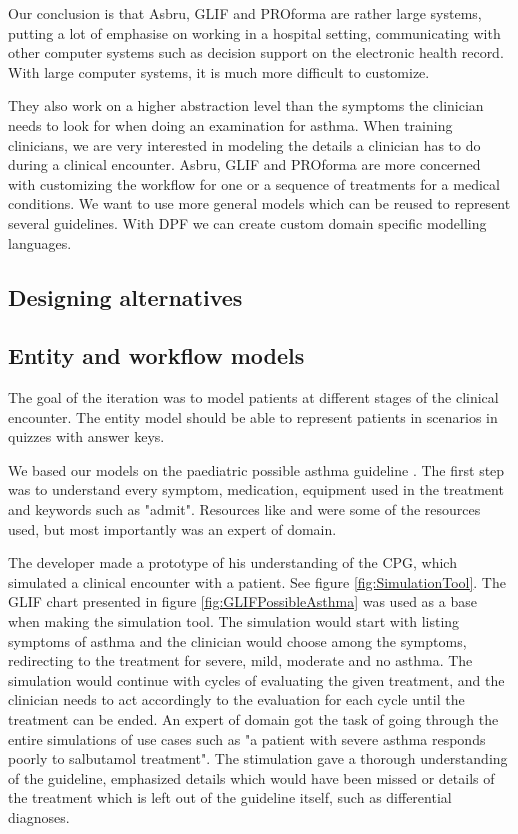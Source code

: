 Our conclusion is that Asbru, GLIF and PROforma are rather large systems, putting a lot of emphasise on working in a hospital setting, communicating with other computer systems such as decision support on the electronic health record. With large computer systems, it is much more difficult to customize.

They also work on a higher abstraction level than the symptoms the clinician needs to look for when doing an examination for asthma. When training clinicians, we are very interested in modeling the details a clinician has to do during a clinical encounter. Asbru, GLIF and PROforma are more concerned with customizing the workflow for one or a sequence of treatments for a medical conditions. We want to use more general models which can be reused to represent several guidelines. With DPF we can create custom domain specific modelling languages.


\subsection{Designing alternatives}

\subsection {Entity and workflow models}
The goal of the iteration was to model patients at different stages of the clinical encounter. The entity model should be able to represent patients in scenarios in quizzes with answer keys.

We based our models on the paediatric possible asthma guideline \cite{RepublicofKeny2016}. The first step was to understand every symptom, medication, equipment used in the treatment and keywords such as "admit". Resources like \textcite{Disease2011} and \textcite{Johansen2018} were some of the resources used, but most importantly was an expert of domain. 

The developer made a prototype of his understanding of the CPG, which simulated a clinical encounter with a patient. See figure \ref{fig:SimulationTool}. The GLIF chart presented in figure \ref{fig:GLIFPossibleAsthma} was used as a base when making the simulation tool. The simulation would start with listing symptoms of asthma and the clinician would choose among the symptoms, redirecting to the treatment for severe, mild, moderate and no asthma. The simulation would continue with cycles of evaluating the given treatment, and the clinician needs to act accordingly to the evaluation for each cycle until the treatment can be ended. An expert of domain got the task of going through the entire simulations of use cases such as "a patient with severe asthma responds poorly to salbutamol treatment". The stimulation gave a thorough understanding of the guideline, emphasized details which would have been missed or details of the treatment which is left out of the guideline itself, such as differential diagnoses.

